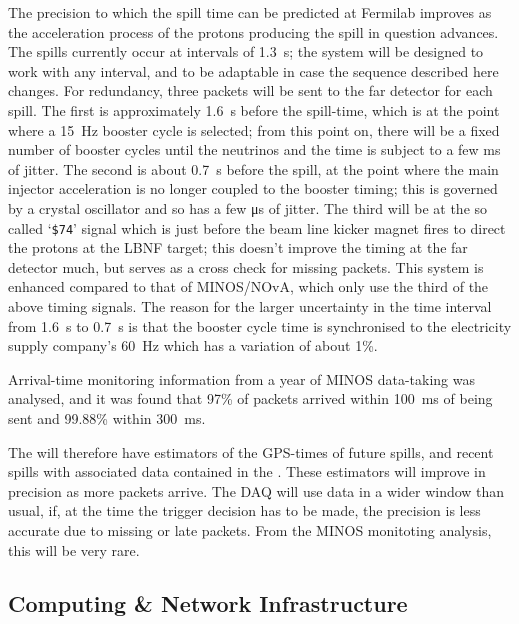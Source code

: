 The precision to which the spill time can be predicted at Fermilab
improves as the acceleration process of the protons producing the
spill in question advances.  The spills currently occur at intervals
of \SI{1.3}{\s}; the system will be designed to work with any interval, and
to be adaptable in case the sequence described here changes.  For
redundancy, three packets will be sent to the far detector for each
spill.  The first is approximately \SI{1.6}{\s} before the spill-time, which
is at the point where a \SI{15}{\Hz} booster cycle is selected; from this
point on, there will be a fixed number of booster cycles until the
neutrinos and the time is subject to a few ms of jitter.  The second
is about \SI{0.7}{\s} before the spill, at the point where the main injector
acceleration is no longer coupled to the booster timing; this is
governed by a crystal oscillator and so has a few \si{\us} of jitter.
The third will be at the so called `\texttt{\$74}' signal which is just before the beam line kicker magnet fires
to direct the protons at the LBNF target; this doesn't improve the
timing at the far detector much, but serves as a cross check for
missing packets.  This system is enhanced compared to that of
MINOS/NOvA, which only use the third of the above timing signals.  The
reason for the larger uncertainty in the time interval from \SI{1.6}{\s} to
\SI{0.7}{\s} is that the booster cycle time is synchronised to the
electricity supply company's \SI{60}{\Hz} which has a variation of about
1\%.

Arrival-time monitoring information from a year of MINOS data-taking
was analysed, and it was found that 97\% of packets arrived within
\SI{100}{\ms} of being sent and 99.88\% within \SI{300}{\ms}.

The  will therefore have estimators of the GPS-times of
future spills, and recent spills with associated data contained in the
. These estimators will improve in precision as
more packets arrive.  The DAQ will use data in a wider window than
usual, if, at the time the trigger decision has to be made, the
precision is less accurate due to missing or late packets.  From the
MINOS monitoting analysis, this will be very rare.

\subsection{Computing \& Network Infrastructure}
\label{sec:fdsp-daq-infra}

